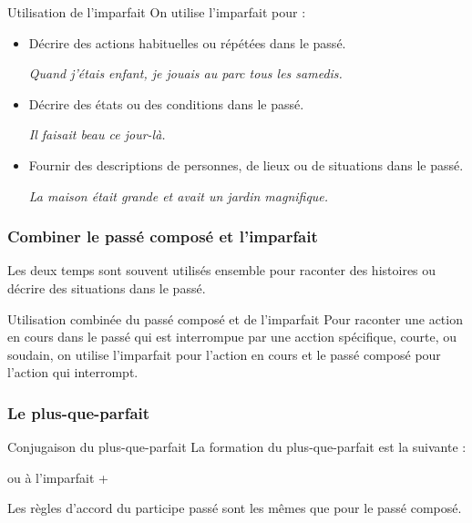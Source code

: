\begin{frbox}[violet]{Utilisation de l'imparfait}
    On utilise l'imparfait pour :
    \begin{itemize}
        \item Décrire des actions habituelles ou répétées dans le passé.
        
        \qquad\textit{Quand j'étais enfant, je jouais au parc tous les samedis.}
        \item Décrire des états ou des conditions dans le passé.
        
        \qquad\textit{Il faisait beau ce jour-là.}
        \item Fournir des descriptions de personnes, de lieux ou de situations dans le passé.
        
        \qquad\textit{La maison était grande et avait un jardin magnifique.}
    \end{itemize}
\end{frbox}

\subsubsection{Combiner le passé composé et l'imparfait}

Les deux temps sont souvent utilisés ensemble pour raconter des histoires ou décrire des situations
dans le passé.

\begin{frbox}[violet]{Utilisation combinée du passé composé et de l'imparfait}
    Pour raconter une action en cours dans le passé qui est interrompue par une acction spécifique,
    courte, ou soudain, on utilise l'imparfait pour l'action en cours et le passé composé pour l'action
    qui interrompt.
\end{frbox}

\subsubsection{Le plus-que-parfait}

\begin{frbox}{Conjugaison du plus-que-parfait}
    La formation du plus-que-parfait est la suivante :

    {
        \centering
         ou  à l'imparfait + \par
    }

    Les règles d'accord du participe passé sont les mêmes que pour le passé composé.
\end{frbox}

